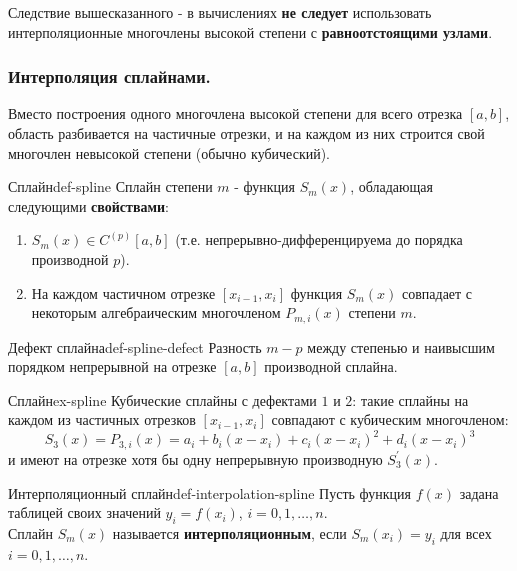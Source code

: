\documentclass[14pt]{extarticle}
\begin{document}
        Следствие вышесказанного - в вычислениях \textbf{не следует} использовать интерполяционные многочлены высокой степени с \textbf{равноотстоящими узлами}.

    \clearpage
    \subsubsection{Интерполяция сплайнами.}

        Вместо построения одного многочлена высокой степени для всего отрезка $[a, b]$, область разбивается на частичные отрезки, и на каждом из них строится свой многочлен невысокой степени (обычно кубический).

        \begin{definition}{Сплайн}{def-spline}
            Сплайн степени $m$ - функция $S_{m}(x)$, обладающая следующими \textbf{свойствами}:
            \begin{enumerate}
                \item $S_{m}(x) \in C^{(p)}[a, b]$ (т.е. непрерывно-дифференцируема до порядка производной $p$).
                \item На каждом частичном отрезке $[x_{i - 1}, x_{i}]$ функция $S_{m}(x)$ совпадает с некоторым алгебраическим многочленом $P_{m, i}(x)$ степени $m$.
            \end{enumerate}
        \end{definition}

        \begin{definition}{Дефект сплайна}{def-spline-defect}
            Разность $m - p$ между степенью и наивысшим порядком непрерывной на отрезке $[a, b]$ производной сплайна.
        \end{definition}

        \begin{example}{Сплайн}{ex-spline}
            Кубические сплайны с дефектами $1$ и $2$: такие сплайны на каждом из частичных отрезков $[x_{i - 1}, x_{i}]$ совпадают с кубическим многочленом:
            $$S_{3}(x) = P_{3, i}(x) = a_{i} + b_{i}(x - x_{i}) + c_{i}(x - x_{i})^{2} + d_{i}(x - x_{i})^{3}$$
            и имеют на отрезке хотя бы одну непрерывную производную $S_{3}^{'}(x)$.
        \end{example}

        \begin{definition}{Интерполяционный сплайн}{def-interpolation-spline}
            Пусть функция $f(x)$ задана таблицей своих значений $y_{i} = f(x_{i})$, $i = 0, 1, \ldots, n$.\\
            Сплайн $S_{m}(x)$ называется \textbf{интерполяционным}, если $S_{m}(x_{i}) = y_{i}$ для всех $i = 0, 1, \ldots, n$.
        \end{definition}
\end{document}
